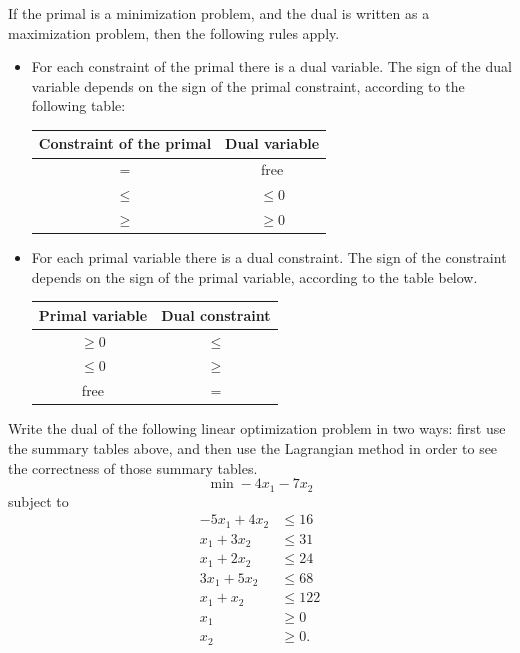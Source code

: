 
If the primal is a minimization problem, and the dual is written as a
maximization problem, then the following rules apply. 
\begin{itemize}
\item For each constraint of the primal there is a dual variable. The
  sign of the dual variable depends on the sign of the primal constraint, according to the following table:
\begin{center}
\begin{tabular}{c | c}
Constraint of the primal & Dual variable \\
\hline
$=$ & free\\
$\leq$ & $\leq 0$\\
$\geq$ & $\geq 0$
\end{tabular}
\end{center}
\item For each primal variable there is a dual constraint. The sign of
  the constraint depends on the sign of the primal variable, according to the table below.
\begin{center}

\begin{tabular}{c | c}
Primal variable & Dual constraint \\
\hline
$\geq 0$ & $\leq$\\
$\leq 0$ & $\geq$\\
free & $=$
\end{tabular}
\end{center}

\end{itemize}

Write the dual of the following linear optimization problem in two
ways: first use the summary tables above, and then use the Lagrangian
method in order to see the correctness of those summary tables.
\[
\min   -4x_1 - 7x_2 
\]
subject to
\begin{align*}
 -5x_1 + 4x_2 &\leq 16 \\
x_1 + 3x_2 &\leq 31 \\
x_1 + 2x_2 &\leq 24 \\
3x_1 +5x_2&\leq  68 \\
x_1 + x_2&\leq 122 \\
x_1 &\geq 0 \\
x_2 &\geq 0. \\
\end{align*}

